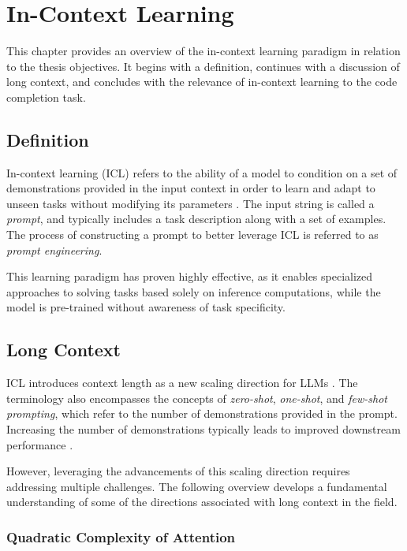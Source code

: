 \chapter{In-Context Learning}\label{chap:in-context-learning}

This chapter provides an overview of the in-context learning paradigm in relation to the thesis objectives. It begins with a definition, continues with a discussion of long context, and concludes with the relevance of in-context learning to the code completion task.

\section{Definition}

In-context learning (ICL) refers to the ability of a model to condition on a set of demonstrations provided in the input context in order to learn and adapt to unseen tasks without modifying its parameters \parencite{brown2020}. The input string is called a \textit{prompt}, and typically includes a task description along with a set of examples. The process of constructing a prompt to better leverage ICL is referred to as \textit{prompt engineering}.

This learning paradigm has proven highly effective, as it enables specialized approaches to solving tasks based solely on inference computations, while the model is pre-trained without awareness of task specificity.

\section{Long Context}

ICL introduces context length as a new scaling direction for LLMs \parencite{kaplan2020}. The terminology also encompasses the concepts of \textit{zero-shot}, \textit{one-shot}, and \textit{few-shot prompting}, which refer to the number of demonstrations provided in the prompt. Increasing the number of demonstrations typically leads to improved downstream performance \parencite{brown2020}.

However, leveraging the advancements of this scaling direction requires addressing multiple challenges. The following overview develops a fundamental understanding of some of the directions associated with long context in the field.

\subsection{Quadratic Complexity of Attention}

